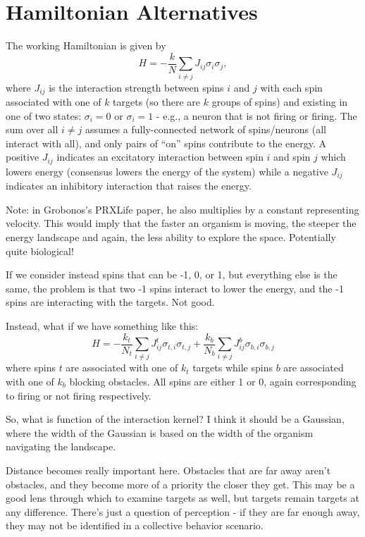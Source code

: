\documentclass[12pt]{article}
\begin{document}
\section*{Hamiltonian Alternatives}

The working Hamiltonian is given by
\[
H = -\frac{k}{N}\sum_{i\neq j}J_{ij}\sigma_i\sigma_j,
\]
where $J_{ij}$ is the interaction strength between spins $i$ and $j$ with each spin associated with one of $k$ targets (so there are $k$ groups of spins) and existing in one of two states: $\sigma_i=0$ or $\sigma_i=1$ - e.g., a neuron that is not firing or firing. The sum over all $i\neq j$ assumes a fully-connected network of spins/neurons (all interact with all), and only pairs of ``on'' spins contribute to the energy. A positive $J_{ij}$ indicates an excitatory interaction between spin $i$ and spin $j$ which lowers energy (consensus lowers the energy of the system) while a negative $J_{ij}$ indicates an inhibitory interaction that raises the energy.

Note: in Grobonos's PRXLife paper, he also multiplies by a constant representing velocity. This would imply that the faster an organism is moving, the steeper the energy landscape and again, the less ability to explore the space. Potentially quite biological! 

If we consider instead spins that can be -1, 0, or 1, but everything else is the same, the problem is that two -1 spins interact to lower the energy, and the -1 spins are interacting with the targets. Not good.

Instead, what if we have something like this:
\[
H = -\frac{k_t}{N_t}\sum_{i\neq j}J^t_{ij}\sigma_{t,i}\sigma_{t,j} + \frac{k_b}{N_b}\sum_{i\neq j}J^b_{ij}\sigma_{b,i}\sigma_{b,j}
\]
where spins $t$ are associated with one of $k_t$ targets while spins $b$ are associated with one of $k_b$ blocking obstacles. All spins are either 1 or 0, again corresponding to firing or not firing respectively.

So, what is function of the interaction kernel? I think it should be a Gaussian, where the width of the Gaussian is based on the width of the organism navigating the landscape.

Distance becomes really important here. Obstacles that are far away aren't obstacles, and they become more of a priority the closer they get. This may be a good lens through which to examine targets as well, but targets remain targets at any difference. There's just a question of perception - if they are far enough away, they may not be identified in a collective behavior scenario.
\end{document}
